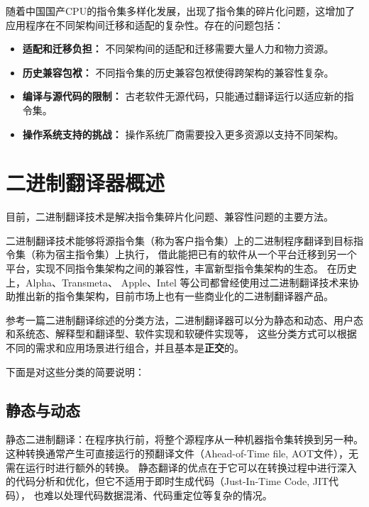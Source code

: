 
随着中国国产CPU的指令集多样化发展，出现了指令集的碎片化问题，这增加了应用程序在不同架构间迁移和适配的复杂性。存在的问题包括：
    \begin{itemize}
    \item \textbf{适配和迁移负担：} 不同架构间的适配和迁移需要大量人力和物力资源。
    
    \item \textbf{历史兼容包袱：} 不同指令集的历史兼容包袱使得跨架构的兼容性复杂。
    
    \item \textbf{编译与源代码的限制：} 古老软件无源代码，只能通过翻译运行以适应新的指令集。
    
    \item \textbf{操作系统支持的挑战：} 操作系统厂商需要投入更多资源以支持不同架构。
    \end{itemize}

\section{二进制翻译器概述}
目前，二进制翻译技术是解决指令集碎片化问题、兼容性问题的主要方法。

二进制翻译技术能够将源指令集（称为客户指令集）上的二进制程序翻译到目标指令集（称为宿主指令集）上执行，
借此能把已有的软件从一个平台迁移到另一个平台，实现不同指令集架构之间的兼容性，丰富新型指令集架构的生态。
在历史上，Alpha\cite{chernoffFX32Profiledirected1998}、Transmeta\cite{dehnertTransmetaCodeMorphing2003}、
Apple\cite{RunningIntelBinaries}、Intel\cite{noauthor_intel_nodate}
等公司都曾经使用过二进制翻译技术来协助推出新的指令集架构，目前市场上也有一些商业化的二进制翻译器产品。

参考一篇二进制翻译综述的分类方法\cite{BT_review}，二进制翻译器可以分为静态和动态、用户态和系统态、解释型和翻译型、软件实现和软硬件实现等，
这些分类方式可以根据不同的需求和应用场景进行组合，并且基本是\textbf{正交}的。

下面是对这些分类的简要说明：

\subsection{静态与动态}
静态二进制翻译：在程序执行前，将整个源程序从一种机器指令集转换到另一种。
这种转换通常产生可直接运行的预翻译文件（Ahead-of-Time file, AOT文件），无需在运行时进行额外的转换。
静态翻译的优点在于它可以在转换过程中进行深入的代码分析和优化，但它不适用于即时生成代码（Just-In-Time Code, JIT代码），
也难以处理代码数据混淆、代码重定位等复杂的情况。

